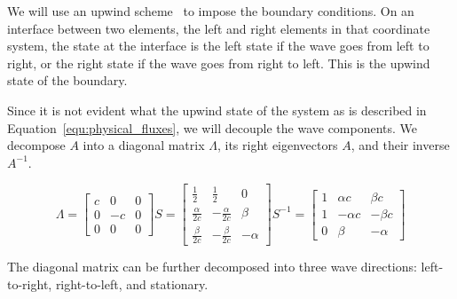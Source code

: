 We will use an upwind scheme~\cite{Toro2009} to impose the boundary conditions. On an interface
between two elements, the left and right elements in that coordinate system, the state at the
interface is the left state if the wave goes from left to right, or the right state if the wave goes
from right to left. This is the upwind state of the boundary.

Since it is not evident what the upwind state of the system as is described in
Equation~\ref{equ:physical_fluxes}, we will decouple the wave components. We decompose \(A\) into a
diagonal matrix \(\Lambda \), its right eigenvectors \(A\), and their inverse \(A^{-1}\).

\begin{equation}
    \Lambda = 
    \begin{bmatrix}
        c & 0 & 0 \\ 
        0 & -c & 0 \\ 
        0 & 0 & 0
    \end{bmatrix}
    S = 
    \begin{bmatrix}
        \frac{1}{2} & \frac{1}{2} & 0 \\ 
        \frac{\alpha}{2 c} & -\frac{\alpha}{2 c} & \beta \\ 
        \frac{\beta}{2 c} & -\frac{\beta}{2 c} & -\alpha 
    \end{bmatrix}
    S^{-1} = 
    \begin{bmatrix}
        1 & \alpha c & \beta c \\ 
        1 & -\alpha c & -\beta c \\ 
        0 & \beta & -\alpha
    \end{bmatrix}
\end{equation}

The diagonal matrix can be further decomposed into three wave directions: left-to-right,
right-to-left, and stationary.

